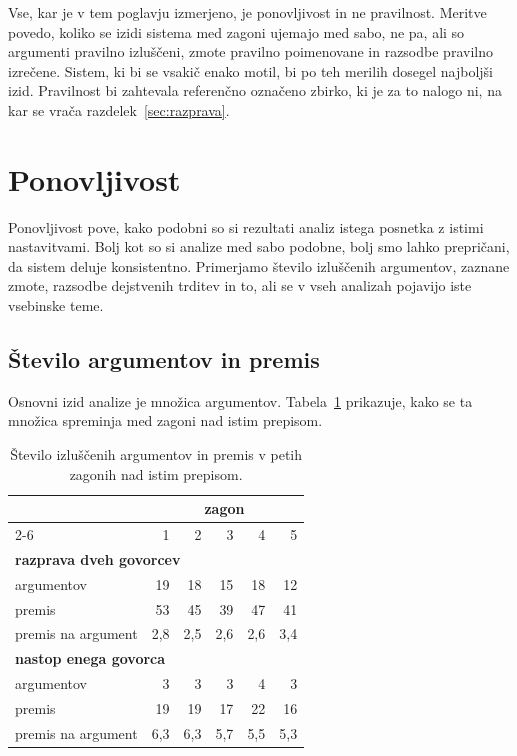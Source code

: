 \documentclass[a4paper, 12pt]{book}
\begin{document}
Vse, kar je v tem poglavju izmerjeno, je ponovljivost in ne pravilnost. Meritve
povedo, koliko se izidi sistema med zagoni ujemajo med sabo, ne pa, ali so
argumenti pravilno izluščeni, zmote pravilno poimenovane in razsodbe pravilno
izrečene. Sistem, ki bi se vsakič enako motil, bi po teh merilih dosegel
najboljši izid. Pravilnost bi zahtevala referenčno označeno zbirko, ki je za to
nalogo ni, na kar se vrača razdelek~\ref{sec:razprava}.

\section{Ponovljivost}
\label{sec:ponovljivost}

Ponovljivost pove, kako podobni so si rezultati analiz istega posnetka z istimi nastavitvami. Bolj kot so si analize med sabo podobne, bolj smo lahko prepričani, da sistem deluje konsistentno. Primerjamo število izluščenih argumentov, zaznane zmote, razsodbe dejstvenih trditev in to, ali se v vseh analizah pojavijo iste vsebinske teme.

\subsection{Število argumentov in premis}

Osnovni izid analize je množica argumentov. Tabela~\ref{tbl:ponovljivost}
prikazuje, kako se ta množica spreminja med zagoni nad istim prepisom.

\begin{table}[htbp]
\centering
\begin{tabular}{lrrrrr}
\toprule
& \multicolumn{5}{c}{zagon} \\
\cmidrule(l){2-6}
& 1 & 2 & 3 & 4 & 5 \\
\midrule
\multicolumn{6}{l}{\textbf{razprava dveh govorcev}} \\
argumentov          & 19 & 18 & 15 & 18 & 12 \\
premis              & 53 & 45 & 39 & 47 & 41 \\
premis na argument  & 2,8 & 2,5 & 2,6 & 2,6 & 3,4 \\
\midrule
\multicolumn{6}{l}{\textbf{nastop enega govorca}} \\
argumentov          & 3 & 3 & 3 & 4 & 3 \\
premis              & 19 & 19 & 17 & 22 & 16 \\
premis na argument  & 6,3 & 6,3 & 5,7 & 5,5 & 5,3 \\
\bottomrule
\end{tabular}
\caption{Število izluščenih argumentov in premis v petih zagonih nad istim
prepisom.}
\label{tbl:ponovljivost}
\end{table}
\end{document}
